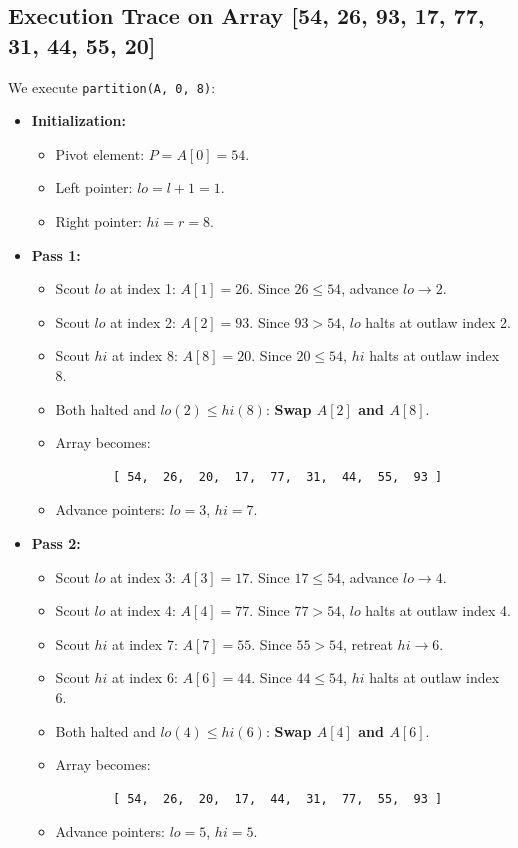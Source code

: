 \documentclass[10pt,journal,compsoc,onecolumn]{IEEEtran}
\begin{document}
\subsection{Execution Trace on Array [54, 26, 93, 17, 77, 31, 44, 55, 20]}

We execute \texttt{partition(A, 0, 8)}:
\begin{itemize}
    \item \textbf{Initialization:}
    \begin{itemize}
        \item Pivot element: $P = A[0] = 54$.
        \item Left pointer: $lo = l + 1 = 1$.
        \item Right pointer: $hi = r = 8$.
    \end{itemize}

    \item \textbf{Pass 1:}
    \begin{itemize}
        \item Scout $lo$ at index 1: $A[1] = 26$. Since $26 \le 54$, advance $lo \to 2$.
        \item Scout $lo$ at index 2: $A[2] = 93$. Since $93 > 54$, $lo$ halts at outlaw index 2.
        \item Scout $hi$ at index 8: $A[8] = 20$. Since $20 \le 54$, $hi$ halts at outlaw index 8.
        \item Both halted and $lo (2) \le hi (8)$: \textbf{Swap $A[2]$ and $A[8]$}.
        \item Array becomes:
        \begin{verbatim}
        [ 54,  26,  20,  17,  77,  31,  44,  55,  93 ]
        \end{verbatim}
        \item Advance pointers: $lo = 3$, $hi = 7$.
    \end{itemize}

    \item \textbf{Pass 2:}
    \begin{itemize}
        \item Scout $lo$ at index 3: $A[3] = 17$. Since $17 \le 54$, advance $lo \to 4$.
        \item Scout $lo$ at index 4: $A[4] = 77$. Since $77 > 54$, $lo$ halts at outlaw index 4.
        \item Scout $hi$ at index 7: $A[7] = 55$. Since $55 > 54$, retreat $hi \to 6$.
        \item Scout $hi$ at index 6: $A[6] = 44$. Since $44 \le 54$, $hi$ halts at outlaw index 6.
        \item Both halted and $lo (4) \le hi (6)$: \textbf{Swap $A[4]$ and $A[6]$}.
        \item Array becomes:
        \begin{verbatim}
        [ 54,  26,  20,  17,  44,  31,  77,  55,  93 ]
        \end{verbatim}
        \item Advance pointers: $lo = 5$, $hi = 5$.
    \end{itemize}


\end{itemize}
\end{document}
